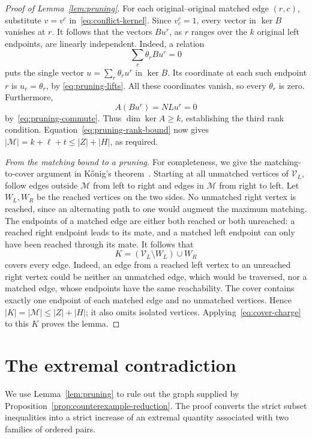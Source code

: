 \documentclass[11pt]{article}
\theoremstyle{remark}
\newcommand{\abs}[1]{\lvert #1\rvert}
\begin{document}
\begin{proof}[Proof of Lemma~\ref{lem:pruning}]
For each original--original matched edge $(r,c)$, substitute $v=v^c$
in~\eqref{eq:conflict-kernel}.  Since $v^c_c=1$, every vector in
$\ker B$ vanishes at $r$.  It follows that the vectors $Bu^r$, as $r$
ranges over the $k$ original left endpoints, are linearly independent.
Indeed, a relation
\[
 \sum_r\theta_r Bu^r=0
\]
puts the single vector $u=\sum_r\theta_r u^r$ in $\ker B$.
Its coordinate at each such endpoint $r$ is $u_r=\theta_r$, by
\eqref{eq:pruning-lifts}.  All these coordinates vanish, so every
$\theta_r$ is zero.  Furthermore,
\[
 A(Bu^r)=NLu^r=0
\]
by~\eqref{eq:pruning-commute}. Thus $\dim\ker A\geq k$, establishing
the third rank condition. Equation~\eqref{eq:pruning-rank-bound} now gives
$\abs{\mathcal M}=k+\ell+t\leq\abs Z+\abs H$, as required.

\medskip\noindent
\emph{From the matching bound to a pruning.}
For completeness, we give the matching-to-cover argument in
K\H{o}nig's theorem~\cite{konig1931}.  Starting at all unmatched vertices
of $\mathcal V_L$, follow edges outside $\mathcal M$ from left to
right and edges in $\mathcal M$ from right to left.  Let $W_L,W_R$
be the reached vertices on the two sides.  No unmatched right vertex
is reached, since an alternating path to one would augment the maximum
matching.  The endpoints of a matched edge are either both reached or
both unreached: a reached right endpoint leads to its mate, and a
matched left endpoint can only have been reached through its mate.
It follows that
\[
 K=(\mathcal V_L\setminus W_L)\cup W_R
\]
covers every edge.  Indeed, an edge from a reached left vertex to an
unreached right vertex could be neither an unmatched edge, which would
be traversed, nor a matched edge, whose endpoints have the same
reachability.  The cover contains exactly one endpoint of each matched
edge and no unmatched vertices.  Hence
$\abs K=\abs{\mathcal M}\leq\abs Z+\abs H$; it also omits isolated
vertices.  Applying~\eqref{eq:cover-charge} to this $K$ proves the lemma.
\end{proof}

\section{The extremal contradiction}\label{sec:incompatibility}

We use Lemma~\ref{lem:pruning} to rule out the graph supplied by
Proposition~\ref{prop:counterexample-reduction}.  The proof converts the strict
subset inequalities into a strict increase of an extremal quantity associated
with two families of ordered pairs.
\end{document}
